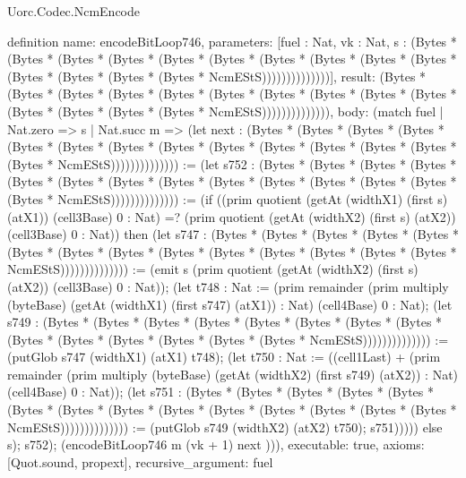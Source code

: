 \begin{lexlean}{Uorc.Codec.NcmEncode}
\begin{semanticmodule}
definition{
  name: encodeBitLoop746,
  parameters: [fuel : Nat, vk : Nat, s : (Bytes * (Bytes * (Bytes * (Bytes * (Bytes * (Bytes * (Bytes * (Bytes * (Bytes * (Bytes * (Bytes * (Bytes * (Bytes * (Bytes * NcmEStS))))))))))))))],
  result: (Bytes * (Bytes * (Bytes * (Bytes * (Bytes * (Bytes * (Bytes * (Bytes * (Bytes * (Bytes * (Bytes * (Bytes * (Bytes * (Bytes * NcmEStS)))))))))))))),
  body: (match fuel
    | Nat.zero => s
    | Nat.succ m => (let next : (Bytes * (Bytes * (Bytes * (Bytes * (Bytes * (Bytes * (Bytes * (Bytes * (Bytes * (Bytes * (Bytes * (Bytes * (Bytes * (Bytes * NcmEStS)))))))))))))) := (let s752 : (Bytes * (Bytes * (Bytes * (Bytes * (Bytes * (Bytes * (Bytes * (Bytes * (Bytes * (Bytes * (Bytes * (Bytes * (Bytes * (Bytes * NcmEStS)))))))))))))) := (if ((prim quotient (getAt (widthX1) (first s) (atX1)) (cell3Base) 0 : Nat) =? (prim quotient (getAt (widthX2) (first s) (atX2)) (cell3Base) 0 : Nat)) then (let s747 : (Bytes * (Bytes * (Bytes * (Bytes * (Bytes * (Bytes * (Bytes * (Bytes * (Bytes * (Bytes * (Bytes * (Bytes * (Bytes * (Bytes * NcmEStS)))))))))))))) := (emit s (prim quotient (getAt (widthX2) (first s) (atX2)) (cell3Base) 0 : Nat)); (let t748 : Nat := (prim remainder (prim multiply (byteBase) (getAt (widthX1) (first s747) (atX1)) : Nat) (cell4Base) 0 : Nat); (let s749 : (Bytes * (Bytes * (Bytes * (Bytes * (Bytes * (Bytes * (Bytes * (Bytes * (Bytes * (Bytes * (Bytes * (Bytes * (Bytes * (Bytes * NcmEStS)))))))))))))) := (putGlob s747 (widthX1) (atX1) t748); (let t750 : Nat := ((cell1Last) + (prim remainder (prim multiply (byteBase) (getAt (widthX2) (first s749) (atX2)) : Nat) (cell4Base) 0 : Nat)); (let s751 : (Bytes * (Bytes * (Bytes * (Bytes * (Bytes * (Bytes * (Bytes * (Bytes * (Bytes * (Bytes * (Bytes * (Bytes * (Bytes * (Bytes * NcmEStS)))))))))))))) := (putGlob s749 (widthX2) (atX2) t750); s751))))) else s); s752); (encodeBitLoop746 m (vk + 1) next ))),
  executable: true,
  axioms: [Quot.sound, propext],
  recursive_argument: fuel
}


\end{semanticmodule}
\end{lexlean}

